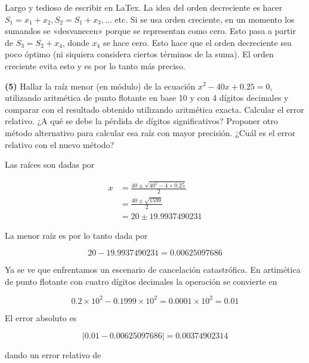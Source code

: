 \documentclass[12pt]{article}
\begin{document}
Largo y tedioso de escribir en LaTex. La idea del orden decreciente es hacer $S_1 =
x_1 + x_2, S_2 = S_1 + x_3, \ldots$ etc. Si se usa orden creciente, en un
momento los sumandos se «desvanecen» porque se representan como cero. Esto pasa
a partir de $S_3 = S_2 + x_4$, donde $x_4$ se hace cero. Esto hace que el orden
decreciente sea poco óptimo (ni siquiera considera ciertos términos de la suma).
El orden creciente evita esto y es por lo tanto más preciso.

\pagebreak 

\begin{myframe}
    \textbf{(5)} Hallar la raíz menor (en módulo) de la ecuación $x^2 - 40x +
    0.25 = 0$, utilizando aritmética de punto flotante en base 10 y con 4
    dígitos decimales y comparar con el resultado obtenido utilizando aritmética
    exacta. Calcular el error relativo. ¿A qué se debe la pérdida de dígitos
    significativos? Proponer otro método alternativo para calcular esa raíz con
    mayor precisión. ¿Cuál es el error relativo con el nuevo método?
\end{myframe}

Las raíces son dadas por

\begin{align*}
    x 
    &= \frac{ 40 \pm \sqrt{40^2 - 4 \times 0.25}  }{2}\\ 
    &= \frac{ 40 \pm \sqrt{1599}  }{2}\\ 
    &= 20 \pm 19.9937490231
\end{align*}

La menor raíz es por lo tanto dada por 

\begin{equation*}
    20 - 19.9937490231 = 0.00625097686
\end{equation*}

Ya se ve que enfrentamos un escenario de cancelación catastrófica. En artimética
de punto flotante con cuatro dígitos decimales la operación se
convierte en 

\begin{equation*}
    0.2 \times 10^2 - 0.1999 \times 10^2 = 0.0001 \times 10^2 = 0.01
\end{equation*}

El error absoluto es 

\begin{equation*}
    \left| 0.01 - 0.00625097686 \right| = 0.00374902314
\end{equation*}

dando un error relativo de 
\end{document}
